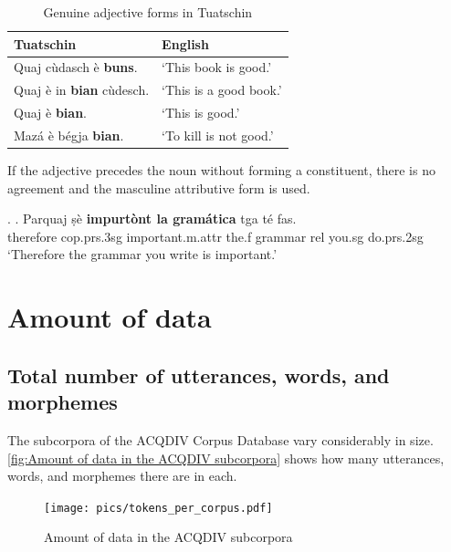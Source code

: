 \documentclass[a4paper, 11pt]{book}
\begin{document}
\begin{table}
\centering
\begin{tabular}{l l}
  \toprule
  Tuatschin & English \\
  \midrule
  Quaj cùdasch è \textbf{buns}.	& ‘This book is good.’ \\
  Quaj è in \textbf{bian} cùdesch.	& ‘This is a good book.’ \\
  Quaj è \textbf{bian}.	& ‘This is good.’ \\
  Mazá è bégja \textbf{bian}.	 & ‘To kill is not good.’ \\
\bottomrule
\end{tabular}
	\caption{Genuine adjective forms in Tuatschin}
	\label{tab:Genuine adjective forms in Tuatschin}
\end{table}

If the adjective precedes the noun without forming a constituent, there is no agreement and the masculine attributive form is used.

\ex.
\ag. Parquaj ṣè \textbf{impurtònt la gramática} tga té fas.\\
therefore cop.prs.3sg important.m.attr the.f grammar rel you.sg do.prs.2sg\\
‘Therefore the grammar you write is important.’\\


%

\section{Amount of data}
\label{sec:Amount of data}

\subsection{Total number of utterances, words, and morphemes}
The subcorpora of the ACQDIV Corpus Database vary considerably in size. \autoref{fig:Amount of data in the ACQDIV subcorpora} shows how many utterances, words, and morphemes there are in each. 

\begin{figure}[ht!]
	\centering
	\texttt{[image: pics/tokens\_per\_corpus.pdf]}
	\caption{Amount of data in the ACQDIV subcorpora}
	\label{fig:Amount of data in the ACQDIV subcorpora}
\end{figure}
\end{document}

